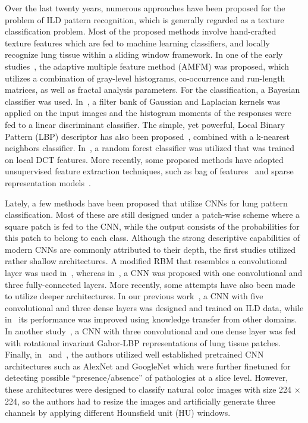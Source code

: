 \documentclass[journal]{IEEEtran}
\begin{document}
Over the last twenty years, numerous approaches have been proposed for the problem of ILD pattern recognition, which is generally regarded as a texture classification problem. Most of the proposed methods involve hand-crafted texture features which are fed to machine learning classifiers, and locally recognize lung tissue within a sliding window framework. In one of the early studies~\cite{uppaluri1999computer}, the adaptive multiple feature method (AMFM) was proposed, which utilizes a combination of gray-level histograms, co-occurrence and run-length matrices, as well as fractal analysis parameters. For the classification, a Bayesian classifier was used. In~\cite{sluimer2003computer}, a filter bank of Gaussian and Laplacian kernels was applied on the input images and the histogram moments of the responses were fed to a linear discriminant classifier. The simple, yet powerful, Local Binary Pattern (LBP) descriptor has also been proposed~\cite{sorensen2010quantitative}, combined with a k-nearest neighbors classifier. In~\cite{antimopoulos2014dct}, a random forest classifier was utilized that was trained on local DCT features. More recently, some proposed methods have adopted unsupervised feature extraction techniques, such as bag of features~\cite{gangeh2010texton, foncubierta2011using} and sparse representation models~\cite{zhao2013classification, vo2011multiscale}. 

Lately, a few methods have been proposed that utilize CNNs for lung pattern classification. Most of these are still designed under a patch-wise scheme where a square patch is fed to the CNN, while the output consists of the probabilities for this patch to belong to each class. Although the strong descriptive capabilities of modern CNNs are commonly attributed to their depth, the first studies utilized rather shallow architectures. A modified RBM that resembles a convolutional layer was used in~\cite{van2014learning}, whereas in~\cite{li2014medical}, a CNN was proposed with one convolutional and three fully-connected layers. More recently, some attempts have also been made to utilize deeper architectures. In our previous work~\cite{AnthimoTMI}, a CNN with five convolutional and three dense layers was designed and trained on ILD data, while in~\cite{christodoulidis2017multi} its performance was improved using knowledge transfer from other domains. In another study~\cite{wang2017multi}, a CNN with three convolutional and one dense layer was fed with rotational invariant Gabor-LBP representations of lung tissue patches. Finally, in~\cite{shin2016deep} and~\cite{gao2017holistic}, the authors utilized well established pretrained CNN architectures such as AlexNet and GoogleNet which were further finetuned for detecting possible ``presence/absence'' of pathologies at a slice level. However, these architectures were designed to classify natural color images with size 224 $\times$ 224, so the authors had to resize the images and artificially generate three channels by applying different Hounsfield unit (HU) windows.
\end{document}
